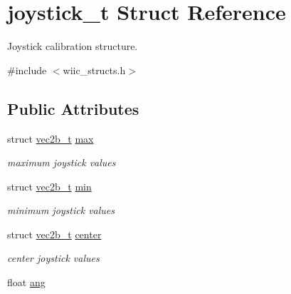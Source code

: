 \hypertarget{structjoystick__t}{\section{joystick\-\_\-t \-Struct \-Reference}
\label{structjoystick__t}
}


\-Joystick calibration structure.  




{\ttfamily \#include $<$wiic\-\_\-structs.\-h$>$}

\subsection*{\-Public \-Attributes}
\begin{DoxyCompactItemize}
\item 
\hypertarget{structjoystick__t_a065529eb4f4ea23be8b95f8705876b12}{struct \hyperlink{structvec2b__t}{vec2b\-\_\-t} \hyperlink{structjoystick__t_a065529eb4f4ea23be8b95f8705876b12}{max}}\label{structjoystick__t_a065529eb4f4ea23be8b95f8705876b12}

\begin{DoxyCompactList}\small\item\em maximum joystick values \end{DoxyCompactList}\item 
\hypertarget{structjoystick__t_aff984e44734968b8f8fdbd52ea8aeb4f}{struct \hyperlink{structvec2b__t}{vec2b\-\_\-t} \hyperlink{structjoystick__t_aff984e44734968b8f8fdbd52ea8aeb4f}{min}}\label{structjoystick__t_aff984e44734968b8f8fdbd52ea8aeb4f}

\begin{DoxyCompactList}\small\item\em minimum joystick values \end{DoxyCompactList}\item 
\hypertarget{structjoystick__t_a7f37b3f10761fd35fe0375377073ac44}{struct \hyperlink{structvec2b__t}{vec2b\-\_\-t} \hyperlink{structjoystick__t_a7f37b3f10761fd35fe0375377073ac44}{center}}\label{structjoystick__t_a7f37b3f10761fd35fe0375377073ac44}

\begin{DoxyCompactList}\small\item\em center joystick values \end{DoxyCompactList}\item 
\hypertarget{structjoystick__t_a59aa4a12fedb3126f21345905d824fc1}{float \hyperlink{structjoystick__t_a59aa4a12fedb3126f21345905d824fc1}{ang}}\label{structjoystick__t_a59aa4a12fedb3126f21345905d824fc1}


\end{DoxyCompactItemize}
